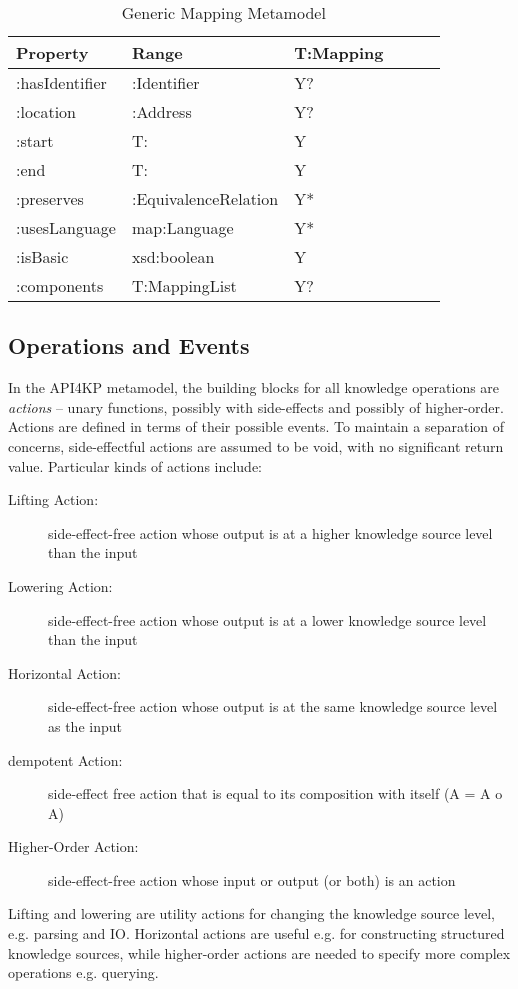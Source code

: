 \documentclass[runningheads]{llncs}
\begin{document}
\begin{table}[h]
\centering
\begin{tabular}{|l|l|l|l|l|l|}
 \hline
\textbf{Property} & \textbf{Range} & \textbf{T:Mapping}   \\ \hline
:hasIdentifier    & :Identifier     &  Y?                       \\ \hline
:location         & :Address       &  Y?                       \\ \hline
:start          & T:               &  Y                       \\ \hline
:end            & T:               &  Y                       \\ \hline
:preserves        & :EquivalenceRelation    &  Y*              \\ \hline
:usesLanguage     & map:Language    &  Y*              \\ \hline
:isBasic         & xsd:boolean     &  Y              \\ \hline
:components      & T:MappingList     &  Y?              \\ \hline
\end{tabular}
\caption{Generic Mapping Metamodel}
\label{krmaponto}
\end{table}

\subsection{Operations and Events}
\label{sec:op}

In the API4KP metamodel, the building blocks for all knowledge operations are \emph{actions} -- unary functions, possibly with side-effects and possibly of higher-order. Actions are defined in terms of their possible events. To maintain a separation of concerns, side-effectful actions are assumed to be void, with no significant return value. Particular kinds of actions include:

\begin{description}
      \item[Lifting Action:] side-effect-free action whose output is at a higher knowledge source level than the input
      \item[Lowering Action:]  side-effect-free action whose output is at a lower knowledge source level than the input
      \item[Horizontal Action:] side-effect-free action whose output is at the same knowledge source level as the input
      \item[dempotent Action:] side-effect free action that is equal to its composition with itself (A = A o A)
      \item[Higher-Order Action:] side-effect-free action whose input or output (or both) is an action
\end{description}
Lifting and lowering are utility actions for changing the knowledge source level, e.g. parsing and IO. 
Horizontal actions are useful e.g. for constructing structured knowledge sources, while higher-order actions are needed to specify more complex operations e.g. querying.
\end{document}
